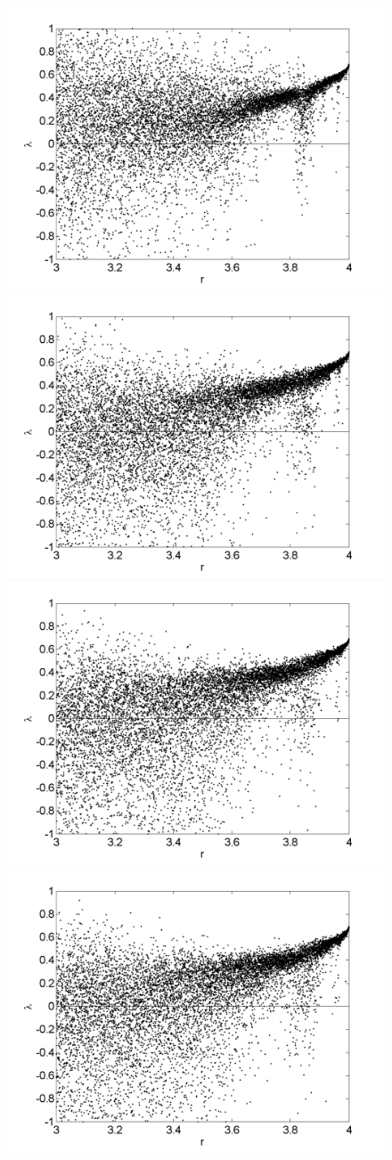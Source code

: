 \begin{figure}[!h]
\includegraphics[width=.5\textwidth]{figs/rlog_lyap_L_01.png}\hfill
\includegraphics[width=.5\textwidth]{figs/rlog_lyap_L_05.png}\\
\includegraphics[width=.5\textwidth]{figs/rlog_lyap_L_07.png}\hfill
\includegraphics[width=.5\textwidth]{figs/rlog_lyap_L_09.png}\\
\end{figure}


